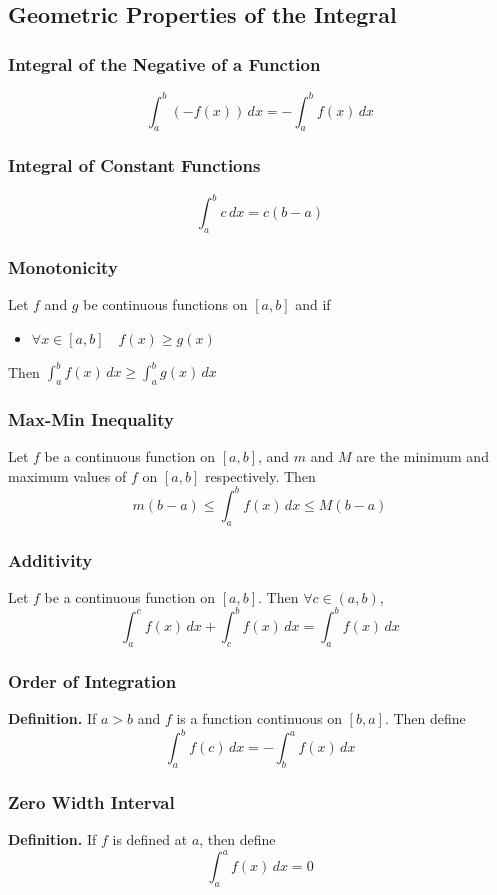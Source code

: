 \documentclass[../ma2002_notes.tex]{subfiles}
\begin{document}
\subsection{Geometric Properties of the Integral}
\subsubsection{Integral of the Negative of a Function}
\[\int_a^b(-f(x))\,dx=-\int_a^bf(x)\,dx\]

\subsubsection{Integral of Constant Functions}
\[\int_a^bc\,dx=c(b-a)\]

\subsubsection{Monotonicity}
Let \(f\) and \(g\) be continuous functions on \([a,b]\) and if
\begin{itemize}
	\item\(\forall x\in[a,b]\quad f(x)\geq g(x)\)
\end{itemize}
Then \(\int_a^bf(x)\,dx\geq\int_a^bg(x)\,dx\)

\subsubsection{Max-Min Inequality}
Let \(f\) be a continuous function on \([a,b]\), and \(m\) and \(M\) are the minimum and maximum values of \(f\) on \([a,b]\) respectively. Then
\[m(b-a)\leq\int_a^bf(x)\,dx\leq M(b-a)\]

\subsubsection{Additivity}
Let \(f\) be a continuous function on \([a,b]\). Then \(\forall c\in(a,b)\),
\[\int_a^cf(x)\,dx+\int_c^bf(x)\,dx=\int_a^bf(x)\,dx\]

\subsubsection{Order of Integration}
\textbf{Definition.} If \(a>b\) and \(f\) is a function continuous on \([b,a]\). Then define
\[\int_a^bf(c)\,dx=-\int_b^af(x)\,dx\]

\subsubsection{Zero Width Interval}
\textbf{Definition.} If \(f\) is defined at \(a\), then define
\[\int_a^af(x)\,dx=0\]
\end{document}
